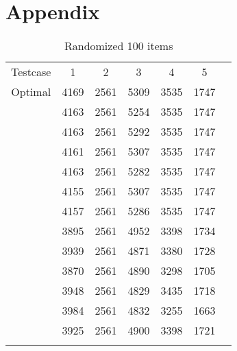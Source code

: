 \documentclass[titlepage]{article}
\begin{document}
\section{Appendix}
\begin{table}[!h]\centering
    \caption{Randomized 100 items} \label{random100}
    \begin{tabu}{|c|c|c|c|c|c|c|}
        Testcase & 1 & 2 & 3 & 4 & 5 \\ [-1pt]  
        Optimal & 4169 & 2561 & 5309 & 3535 & 1747 \\ [-1pt]  
         & 4163 & 2561 & 5254 & 3535 & 1747 \\ 
        & 4163 & 2561 &5292 &3535 &1747 \\  
        &4161 &2561 &5307 &3535 &1747 \\  
        &4163 &2561 &5282 &3535 &1747 \\  
        &4155 &2561 &5307 &3535 &1747 \\  
        &4157 &2561 &5286 &3535 &1747 \\[-1pt] 
         &3895 &2561 &4952 &3398 &1734 \\ 
        &3939 &2561 &4871 &3380 &1728 \\ 
        &3870 &2561 &4890 &3298 &1705 \\ 
        &3948 &2561 &4829 &3435 &1718 \\ 
        &3984 &2561 &4832 &3255 &1663 \\ 
        &3925 &2561 &4900 &3398 &1721 \\[-1pt] 
    \end{tabu}
\end{table}
\end{document}
